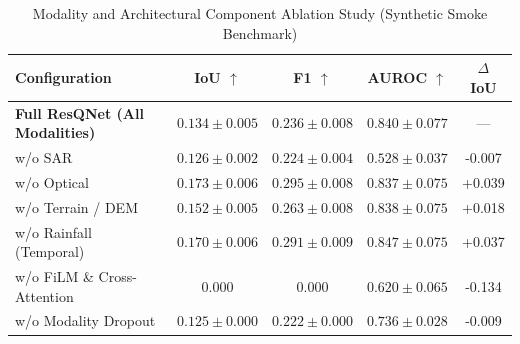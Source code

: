 \begin{table}[h]
\centering
\caption{Modality and Architectural Component Ablation Study (Synthetic Smoke Benchmark)}
\label{tab:ablation}
\begin{tabular}{lcccc}
\toprule
Configuration & IoU $\uparrow$ & F1 $\uparrow$ & AUROC $\uparrow$ & $\Delta$ IoU \\
\midrule
\textbf{Full ResQNet (All Modalities)} & $0.134 \pm 0.005$ & $0.236 \pm 0.008$ & $0.840 \pm 0.077$ & --- \\
w/o SAR & $0.126 \pm 0.002$ & $0.224 \pm 0.004$ & $0.528 \pm 0.037$ & -0.007 \\
w/o Optical & $0.173 \pm 0.006$ & $0.295 \pm 0.008$ & $0.837 \pm 0.075$ & +0.039 \\
w/o Terrain / DEM & $0.152 \pm 0.005$ & $0.263 \pm 0.008$ & $0.838 \pm 0.075$ & +0.018 \\
w/o Rainfall (Temporal) & $0.170 \pm 0.006$ & $0.291 \pm 0.009$ & $0.847 \pm 0.075$ & +0.037 \\
w/o FiLM \& Cross-Attention & $0.000$ & $0.000$ & $0.620 \pm 0.065$ & -0.134 \\
w/o Modality Dropout & $0.125 \pm 0.000$ & $0.222 \pm 0.000$ & $0.736 \pm 0.028$ & -0.009 \\
\bottomrule
\end{tabular}
\end{table}